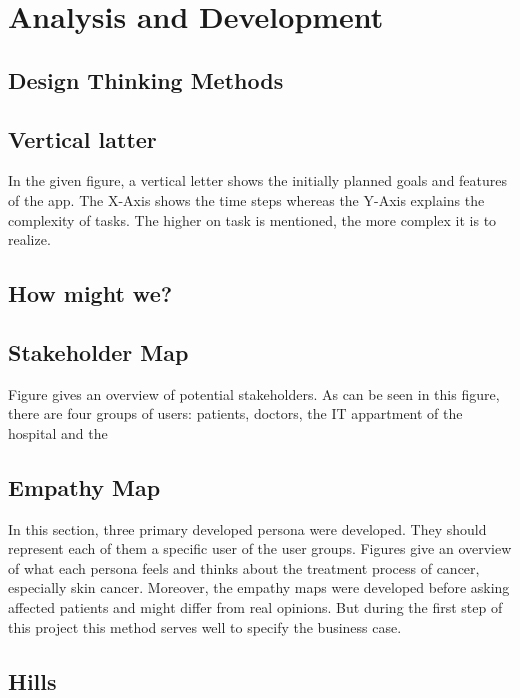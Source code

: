 \section{Analysis and Development}

\subsection{Design Thinking Methods}



\subsection{Vertical latter}

In the given figure, a vertical letter shows the initially planned goals and features of the app. The X-Axis shows the time steps whereas the Y-Axis explains the complexity of tasks. The higher on task is mentioned, the more complex it is to realize.



\subsection{How might we?}


\subsection{Stakeholder Map}

Figure gives an overview of potential stakeholders. As can be seen in this figure, there are four groups of users: patients, doctors, the IT appartment of the hospital and the 



\subsection{Empathy Map}

In this section, three primary developed persona were developed. They should represent each of them a specific user of the user groups. Figures  give an overview of what each persona feels and thinks about the treatment process of cancer, especially skin cancer. Moreover, the empathy maps were developed before asking affected patients and might differ from real opinions. But during the first step of this project this method serves well to specify the business case. 




\subsection{Hills}


